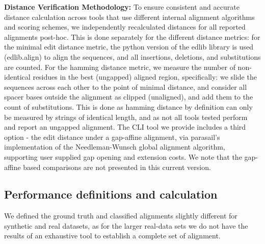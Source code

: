 \documentclass[
]{article}
\begin{document}
\textbf{Distance Verification Methodology:} To ensure consistent and
accurate distance calculation across tools that use different internal
alignment algorithms and scoring schemes, we independently recalculated
distances for all reported alignments post-hoc. This is done separately
for the different distance metrics: for the minimal edit distance
metric, the python version of the edlib
library\autocite{Šošić_Šikić_2017_edlib} is used (edlib.align) to align
the sequences, and all insertions, deletions, and substitutions are
counted. For the hamming distance metric, we measure the number of
non-identical residues in the best (ungapped) aligned region,
specifically: we slide the sequences across each other to the point of
minimal distance, and consider all spacer bases outside the alignment as
clipped (unaligned), and add them to the count of substitutions. This is
done as hamming distance by definition can only be measured by strings
of identical length, and as not all tools tested perform and report an
ungapped alignment. The CLI tool we provide includes a third option -
the edit distance under a gap-affine alignment, via
parasail's\autocite{Daily2016_parasail} implementation of the
Needleman-Wunsch global alignment algorithm, supporting user supplied
gap opening and extension costs. We note that the gap-affine based
comparisons are not presented in this current version.

\subsection{Performance definitions and
calculation}\label{sec-performance-calc}

We defined the ground truth and classified alignments slightly different
for synthetic and real datasets, as for the larger real-data sets we do
not have the results of an exhaustive tool to establish a complete set
of alignment.
\end{document}
